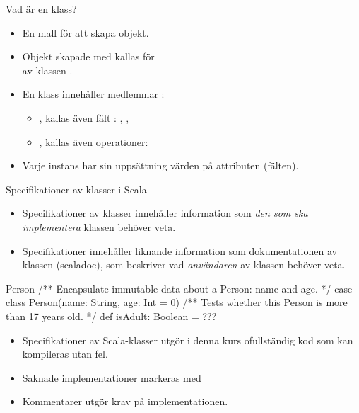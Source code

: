 

\begin{Slide}{Vad är en klass?}
\begin{itemize} 
\item En mall för att skapa objekt.
\item Objekt skapade med  kallas för\\   av klassen .
\item En klass innehåller medlemmar : 
  \begin{itemize} 
  \item {}, kallas även fält : , ,  
  \item {}, kallas även operationer: 
  \end{itemize}
\item Varje instans har sin uppsättning värden på attributen (fälten).
\end{itemize}

\end{Slide}


\begin{Slide}{Specifikationer av klasser i Scala}\footnotesize
\begin{itemize}
\item Specifikationer av klasser innehåller information som \emph{den som ska implementera} klassen behöver veta.
\item Specifikationer innehåller liknande information som dokumentationen av klassen (scaladoc), som beskriver vad \emph{användaren} av klassen behöver veta.  
\end{itemize}
\begin{ScalaSpec}{Person}
/** Encapsulate immutable data about a Person: name and age. */ 
case class Person(name: String, age: Int = 0){
  /** Tests whether this Person is more than 17 years old. */
  def isAdult: Boolean = ???
}
\end{ScalaSpec}
\begin{itemize}
\item Specifikationer av Scala-klasser utgör i denna kurs ofullständig kod som kan kompileras utan fel. 
\item Saknade implementationer markeras med 
\item Kommentarer utgör krav på implementationen.
\end{itemize}

\end{Slide}


